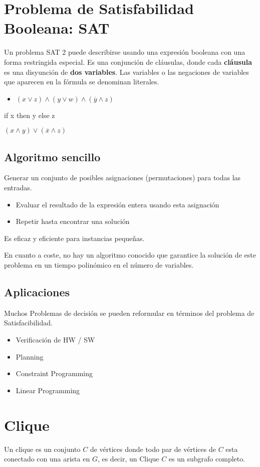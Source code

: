 \section{Problema de Satisfabilidad Booleana: SAT}
Un problema SAT 2 puede describirse usando una expresión booleana con una forma restringida especial. Es una conjunción de cláusulas, donde cada \textbf{cláusula} es una disyunción de \textbf{dos variables}. Las variables o las negaciones de variables que aparecen en la fórmula se denominan literales.
\begin{itemize}
	\item $(x \vee z) \wedge (y \vee w) \wedge (\overline{y} \wedge z)$
\end{itemize}

if x then y else z

$(x \wedge y) \vee (\overline{x} \wedge z)$
\pagebreak

\subsection{Algoritmo sencillo}
Generar un conjunto de posibles asignaciones (permutaciones) para todas las entradas.
\begin{itemize}
	\item Evaluar el resultado de la expresión entera usando esta asignación
	\item Repetir hasta encontrar una solución
\end{itemize}
Es eficaz y eficiente para instancias pequeñas.

En cuanto a coste, no hay un algoritmo conocido que garantice la solución de este problema en un tiempo polinómico en el número de variables.

\subsection{Aplicaciones}
Muchos Problemas de decisión se pueden reformular en términos del problema de Satisfacibilidad.
\begin{itemize}
	\item Verificación de HW / SW
	\item Planning
	\item Constraint Programming
	\item Linear Programming
\end{itemize}

\section{Clique}
Un clique es un conjunto $C$ de vértices donde todo par de vértices de $C$ esta conectado con una arista en $G$, es decir, un Clique $C$ es un subgrafo completo.

